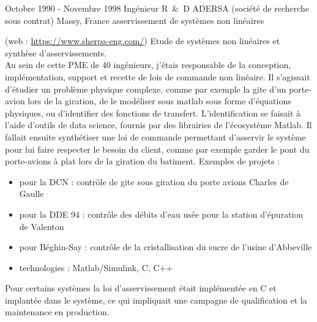 
\item{
\cventry
{Octobre 1990 - Novembre 1998} %
{Ingénieur R~\&~D } %
{ADERSA (société de recherche sous contrat)} %
{Massy, France} %
{asservissement de systèmes non linéaires
}
{ 
(web : \href{https://www.sherpa-eng.com/}{https://www.sherpa-eng.com/})
Etude de systèmes non linéaires et synthèse d'asservissements.    \\[6pt]
Au sein de cette PME de 40 ingénieurs, j'étais responsable de la conception, implémentation, support et recette de lois de commande non linéaire. Il s'agissait d'étudier un problème physique complexe, comme par exemple la gite d'un porte-avion lors de la giration, de le modéliser sous matlab sous forme d'équations physiques, ou d'identifier des fonctions de transfert.
\newline
L'identification se faisait à l'aide d'outils de data science, fournis par des librairies de l'écosystème Matlab.
 Il fallait ensuite synthétiser une loi de commande permettant d'asservir le système pour lui faire respecter le besoin du client, comme par exemple garder le pont du porte-avions à plat lors de la giration du batiment.
\newline
Exemples de projets :
\begin{itemize}
\item {pour la DCN : contrôle de gite sous giration du porte avions Charles de Gaulle}
\item {pour la DDE 94 : contrôle des débits d'eau usée pour la station d'épuration de Valenton}
\item {pour Béghin-Say : contrôle de la cristallisation du sucre de l'usine d'Abbeville}
\item {technologies : Matlab/Simulink, C, C++}
\end{itemize}
Pour certains systèmes la loi d'asservissement était implémentée en C et implantée dans le système, ce qui impliquait une campagne de qualification et la maintenance en production.
} %
} %
